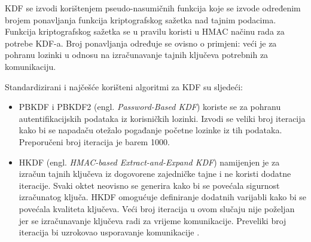 KDF se izvodi korištenjem pseudo-nasumičnih funkcija koje se izvode određenim 
brojem ponavljanja funkcija kriptografskog sažetka nad tajnim podacima. Funkcija
kriptografskog sažetka se u pravilu koristi u HMAC  načinu rada za potrebe
KDF-a. Broj ponavljanja određuje se ovisno o primjeni: veći je za pohranu
lozinki u odnosu na izračunavanje tajnih ključeva potrebnih za komunikaciju.

Standardizirani i najčešće korišteni algoritmi za KDF su sljedeći:
\begin{itemize}
\item PBKDF i PBKDF2 (engl. \emph{Password-Based KDF}) \cite{chen2008recommendation}
    koriste se za pohranu autentifikacijskih
podataka iz korisničkih lozinki. Izvodi se veliki broj iteracija kako bi se
napadaču otežalo pogađanje početne lozinke iz tih podataka. Preporučeni broj
iteracija je barem 1000.
\item HKDF (engl. \emph{HMAC-based Extract-and-Expand KDF})
\cite{rfc5869} namijenjen je za izračun tajnih ključeva iz dogovorene zajedničke
tajne i ne koristi dodatne iteracije. Svaki oktet neovisno se generira kako bi
se povećala sigurnost izračunatog ključa.  HKDF omogućuje definiranje dodatnih
varijabli kako bi se povećala kvaliteta ključeva.  Veći broj iteracija u ovom
slučaju nije poželjan jer se izračunavanje ključeva radi za vrijeme
komunikacije. Preveliki broj iteracija bi uzrokovao usporavanje komunikacije
\cite{krawczyk2010cryptographic}.
\end{itemize}
